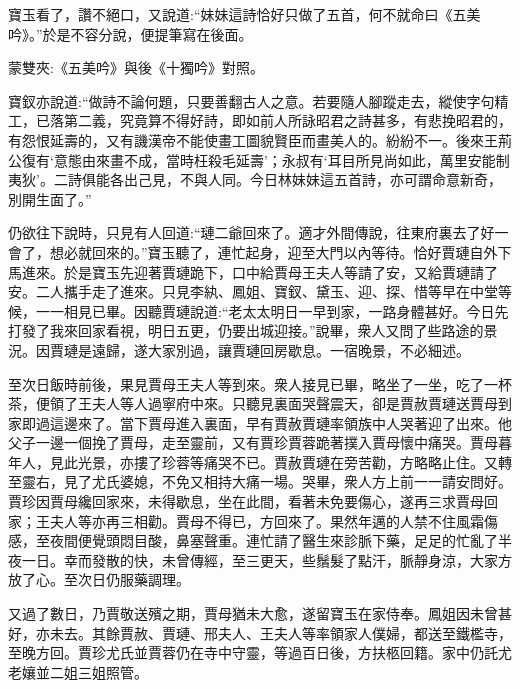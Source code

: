 \begin{parag}
    寶玉看了，讚不絕口，又說道:“妹妹這詩恰好只做了五首，何不就命曰《五美吟》。”於是不容分說，便提筆寫在後面。\begin{note}蒙雙夾:《五美吟》與後《十獨吟》對照。\end{note}寶釵亦說道:“做詩不論何題，只要善翻古人之意。若要隨人腳蹤走去，縱使字句精工，已落第二義，究竟算不得好詩，即如前人所詠昭君之詩甚多，有悲挽昭君的，有怨恨延壽的，又有譏漢帝不能使畫工圖貌賢臣而畫美人的。紛紛不一。後來王荊公復有‘意態由來畫不成，當時枉殺毛延壽’；永叔有‘耳目所見尚如此，萬里安能制夷狄’。二詩俱能各出己見，不與人同。今日林妹妹這五首詩，亦可謂命意新奇，別開生面了。”
\end{parag}


\begin{parag}
    仍欲往下說時，只見有人回道:“璉二爺回來了。適才外間傳說，往東府裏去了好一會了，想必就回來的。”寶玉聽了，連忙起身，迎至大門以內等待。恰好賈璉自外下馬進來。於是寶玉先迎著賈璉跪下，口中給賈母王夫人等請了安，又給賈璉請了安。二人攜手走了進來。只見李紈、鳳姐、寶釵、黛玉、迎、探、惜等早在中堂等候，一一相見已畢。因聽賈璉說道:“老太太明日一早到家，一路身體甚好。今日先打發了我來回家看視，明日五更，仍要出城迎接。”說畢，衆人又問了些路途的景況。因賈璉是遠歸，遂大家別過，讓賈璉回房歇息。一宿晚景，不必細述。
\end{parag}


\begin{parag}
    至次日飯時前後，果見賈母王夫人等到來。衆人接見已畢，略坐了一坐，吃了一杯茶，便領了王夫人等人過寧府中來。只聽見裏面哭聲震天，卻是賈赦賈璉送賈母到家即過這邊來了。當下賈母進入裏面，早有賈赦賈璉率領族中人哭著迎了出來。他父子一邊一個挽了賈母，走至靈前，又有賈珍賈蓉跪著撲入賈母懷中痛哭。賈母暮年人，見此光景，亦摟了珍蓉等痛哭不已。賈赦賈璉在旁苦勸，方略略止住。又轉至靈右，見了尤氏婆媳，不免又相持大痛一場。哭畢，衆人方上前一一請安問好。賈珍因賈母纔回家來，未得歇息，坐在此間，看著未免要傷心，遂再三求賈母回家；王夫人等亦再三相勸。賈母不得已，方回來了。果然年邁的人禁不住風霜傷感，至夜間便覺頭悶目酸，鼻塞聲重。連忙請了醫生來診脈下藥，足足的忙亂了半夜一日。幸而發散的快，未曾傳經，至三更天，些鬚髮了點汗，脈靜身涼，大家方放了心。至次日仍服藥調理。
\end{parag}


\begin{parag}
    又過了數日，乃賈敬送殯之期，賈母猶未大愈，遂留寶玉在家侍奉。鳳姐因未曾甚好，亦未去。其餘賈赦、賈璉、邢夫人、王夫人等率領家人僕婦，都送至鐵檻寺，至晚方回。賈珍尤氏並賈蓉仍在寺中守靈，等過百日後，方扶柩回籍。家中仍託尤老孃並二姐三姐照管。
\end{parag}


